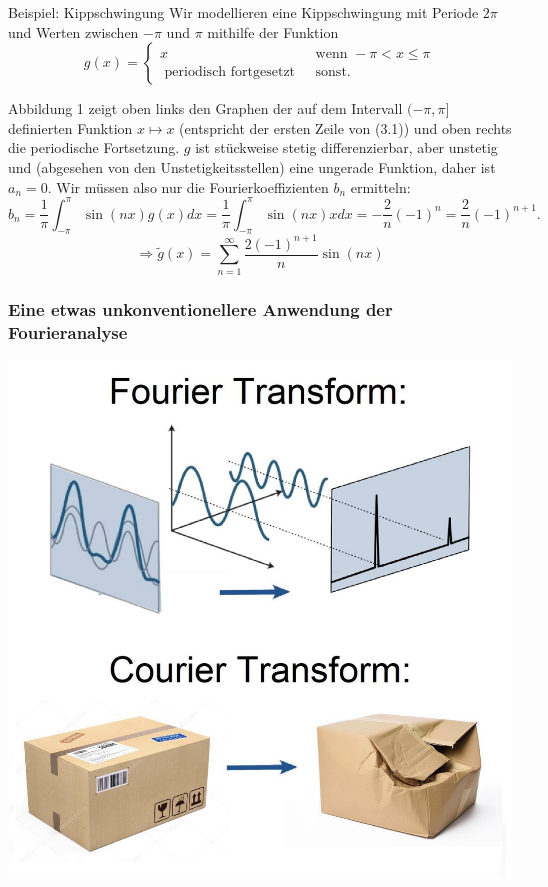\documentclass[
	11pt, %
]{beamer}
\begin{document}
\begin{frame}
	\begin{exampleblock}{Beispiel: Kippschwingung}
		Wir modellieren eine Kippschwingung mit Periode $2 \pi$ und Werten zwischen $-\pi$ und $\pi$ mithilfe der Funktion
		$$
		g(x)=\left\{\begin{array}{cl}
			x & \text { wenn }-\pi<x \leq \pi \\
			\text { periodisch fortgesetzt } & \text { sonst. }
		\end{array}\right.
		$$

		Abbildung 1 zeigt oben links den Graphen der auf dem Intervall $(-\pi, \pi]$ definierten Funktion $x \mapsto x$ (entspricht der ersten Zeile von (3.1)) und oben rechts die periodische Fortsetzung. $g$ ist stückweise stetig differenzierbar, aber unstetig und (abgesehen von den Unstetigkeitsstellen) eine ungerade Funktion, daher ist $a_n=0$. Wir müssen also nur die Fourierkoeffizienten $b_n$ ermitteln:
		$$
		b_n=\frac{1}{\pi} \int_{-\pi}^\pi \sin (n x) g(x) d x=\frac{1}{\pi} \int_{-\pi}^\pi \sin (n x) x d x = -\frac{2}{n}(-1)^n= \frac{2}{n}(-1)^{n+1} .
		$$
		$$
		\Rightarrow\widetilde{g}(x)=\sum_{n=1}^{\infty} \frac{2(-1)^{n+1}}{n} \sin (n x)
		$$
	\end{exampleblock}
\end{frame}
\begin{frame}
	\frametitle{Eine etwas unkonventionellere Anwendung der Fourieranalyse}
	\begin{center}
	\includegraphics[scale=0.17]{ct}
	\end{center}
\end{frame}
\end{document}

